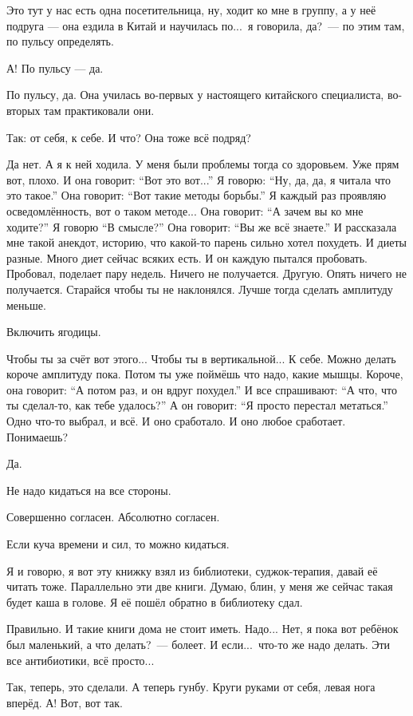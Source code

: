 \M
Это тут у нас есть
одна посетительница, ну, ходит ко мне в группу, а у неё подруга ---
она ездила в Китай и научилась по...\
я говорила, да?\ --- по этим там, по пульсу определять.

\I
А! По пульсу --- да.

\M
По пульсу, да.
Она училась во-первых у настоящего китайского специалиста, во-вторых там практиковали они.

\I
Так: от себя, к себе.
И что? Она тоже всё подряд?

\M
Да нет. А я к ней ходила. У меня
были проблемы тогда со здоровьем. Уже прям вот, плохо.
И она говорит: ``Вот это вот...'' Я говорю: ``Ну, да, да, я читала что это такое.''
Она говорит: ``Вот такие методы борьбы.''
Я каждый раз проявляю осведомлённость, вот о таком методе...
Она говорит: ``А зачем вы ко мне ходите?''
Я говорю ``В смысле?''
Она говорит: ``Вы же всё знаете.''
И рассказала мне такой анекдот, историю, что какой-то парень сильно хотел похудеть.
И диеты разные.
Много диет сейчас всяких есть.
И он каждую пытался пробовать. Пробовал, поделает пару недель.
Ничего не получается.
Другую. Опять ничего не получается.
Старайся чтобы ты не наклонялся.
Лучше тогда сделать амплитуду меньше.

\I
Включить ягодицы.

\M
Чтобы ты за счёт вот
этого...
Чтобы ты в вертикальной...
К себе.
Можно делать короче амплитуду пока.
Потом ты уже поймёшь что надо,
какие мышцы.
Короче, она говорит: ``А потом раз, и он вдруг похудел.''
И все спрашивают: ``А что, что ты сделал-то, как тебе удалось?''
А он говорит: ``Я просто перестал метаться.'' Одно что-то
выбрал, и всё. И оно сработало. И оно любое сработает. Понимаешь?

\I
Да.

\M
Не надо кидаться на все стороны.

\I
Совершенно согласен. Абсолютно согласен.

\M
Если куча времени и сил,
то можно кидаться.

\I
Я и говорю, я вот эту книжку взял из библиотеки, суджок-терапия, давай её читать
тоже. Параллельно эти две книги. Думаю, блин, у меня же
сейчас такая будет каша в голове. Я её пошёл обратно в библиотеку сдал.

\M
Правильно.
И такие книги дома не стоит иметь. Надо... Нет,
я пока вот ребёнок был маленький, а что делать?\ --- болеет.
И если...\ что-то же надо делать.
Эти все антибиотики, всё просто...

\I
Так, теперь, это сделали. А теперь гунбу. Круги
руками от себя, левая нога вперёд. А! Вот, вот так.

